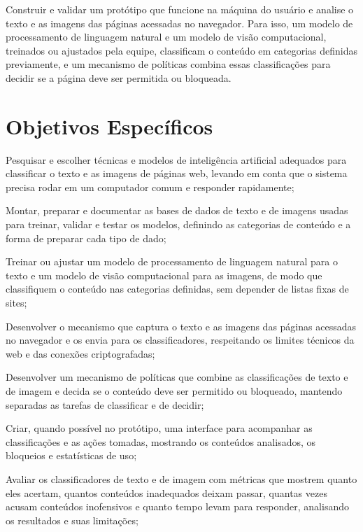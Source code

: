 \documentclass[
    12pt,           %
    oneside,        %
    a4paper,        %
    chapter=TITLE,  %
    english,        %
    brazil          %
]{abntex2}
\begin{document}
Construir e validar um protótipo que funcione na máquina do usuário e analise
o texto e as imagens das páginas acessadas no navegador. Para isso, um modelo
de processamento de linguagem natural e um modelo de visão computacional,
treinados ou ajustados pela equipe, classificam o conteúdo em categorias
definidas previamente, e um mecanismo de políticas combina essas
classificações para decidir se a página deve ser permitida ou bloqueada.

\section{Objetivos Específicos}

\begin{alineas}
    \item Pesquisar e escolher técnicas e modelos de inteligência artificial adequados para classificar o texto e as imagens de páginas web, levando em conta que o sistema precisa rodar em um computador comum e responder rapidamente;
    \item Montar, preparar e documentar as bases de dados de texto e de imagens usadas para treinar, validar e testar os modelos, definindo as categorias de conteúdo e a forma de preparar cada tipo de dado;
    \item Treinar ou ajustar um modelo de processamento de linguagem natural para o texto e um modelo de visão computacional para as imagens, de modo que classifiquem o conteúdo nas categorias definidas, sem depender de listas fixas de sites;
    \item Desenvolver o mecanismo que captura o texto e as imagens das páginas acessadas no navegador e os envia para os classificadores, respeitando os limites técnicos da web e das conexões criptografadas;
    \item Desenvolver um mecanismo de políticas que combine as classificações de texto e de imagem e decida se o conteúdo deve ser permitido ou bloqueado, mantendo separadas as tarefas de classificar e de decidir;
    \item Criar, quando possível no protótipo, uma interface para acompanhar as classificações e as ações tomadas, mostrando os conteúdos analisados, os bloqueios e estatísticas de uso;
    \item Avaliar os classificadores de texto e de imagem com métricas que mostrem quanto eles acertam, quantos conteúdos inadequados deixam passar, quantas vezes acusam conteúdos inofensivos e quanto tempo levam para responder, analisando os resultados e suas limitações;

\end{alineas}
\end{document}
